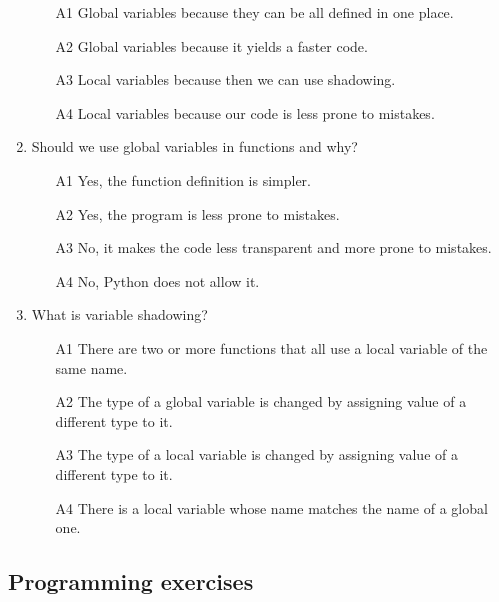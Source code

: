 \begin{enumerate}
\begin{enumerate}
\item[A1] Global variables because they can be all defined in one place.
\item[A2] Global variables because it yields a faster code.
\item[A3] Local variables because then we can use shadowing.
\item[A4] Local variables because our code is less prone to mistakes. 
\end{enumerate}
\item Should we use global variables in functions and why?
\begin{enumerate}
\item[A1] Yes, the function definition is simpler.
\item[A2] Yes, the program is less prone to mistakes.
\item[A3] No, it makes the code less transparent and more prone to mistakes.
\item[A4] No, Python does not allow it.
\end{enumerate}
\item What is variable shadowing?
\begin{enumerate}
\item[A1] There are two or more functions that all use a local variable of the same name.
\item[A2] The type of a global variable is changed by assigning value of a different type to it. 
\item[A3] The type of a local variable is changed by assigning value of a different type to it. 
\item[A4] There is a local variable whose name matches the name of a global one.
\end{enumerate}
\end{enumerate}

\subsection{Programming exercises}


